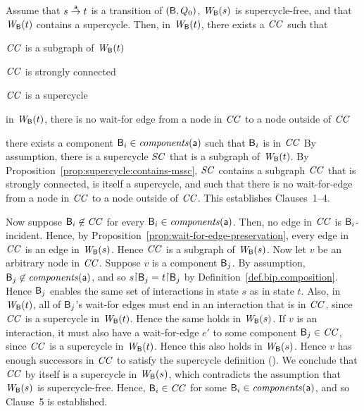  \label{prop:supercycle-formation}
Assume that $s \goesto[\act] t$ is a transition of $(\B, Q_0)$, $\wfg{\B}{s}$ is supercycle-free, and that $\wfg{\B}{t}$
contains a supercycle.  Then, in $\wfg{\B}{t}$, there exists a $\CC$ such that
\bn
\item $\CC$ is a subgraph of $\wfg{\B}{t}$
\item $\CC$ is strongly connected
\item $\CC$ is a supercycle
\item  in $\wfg{\B}{t}$, there is no wait-for edge from a node in $\CC$ to a node outside of $\CC$
\item there exists a component $\B_i \in \cmps{\act}$ such that $\B_i$ is in $\CC$
\en
\ep
%
\bpr
By assumption, there is a supercycle $\SC$ that is a subgraph of $\wfg{\B}{t}$.
By Proposition~\ref{prop:supercycle:contains-mssc}, $\SC$ contains a
subgraph $\CC$ that is strongly connected, is itself a supercycle, and
such that there is no wait-for-edge from a node in $\CC$ to a node outside of $\CC$.
This establishes Clauses~1--4.

Now suppose $\B_i \not\in \CC$ for every $\B_i \in \cmps{\act}$. Then, no edge in $\CC$ is
$\B_i$-incident.  Hence, by Proposition~\ref{prop:wait-for-edge-preservation}, every edge in $\CC$
is an edge in $\wfg{\B}{s}$. Hence $\CC$ is a subgraph of $\wfg{\B}{s}$.
%
Now let $v$ be an arbitrary node in $\CC$.
%
Suppose $v$ is a component $\B_j$.  By assumption, $\B_j \not\in \cmps{\act}$, and so
$s \pj \B_j = t \pj \B_j$ by Definition~\ref{def.bip.composition}. Hence $\B_j$ enables the same set
of interactions in state $s$ as in state $t$. Also, in $\wfg{\B}{t}$, all of $\B_j$'s wait-for edges
must end in an interaction that is in $\CC$, since $\CC$ is a supercycle in $\wfg{\B}{t}$. Hence the
same holds in $\wfg{\B}{s}$.
%
If $v$ is an interaction, it must also have a wait-for-edge $e'$ to some component $\B_j \in \CC$,
since $\CC$ is a supercycle in $\wfg{\B}{t}$. Hence this also holds in $\wfg{\B}{s}$.
%
Hence $v$ has enough successors in $\CC$ to satisfy the supercycle definition ().
%
We conclude that $\CC$ by itself is a supercycle in $\wfg{\B}{s}$, which contradicts the assumption
that $\wfg{\B}{s}$ is supercycle-free. Hence, $\B_i \in \CC$ for some $\B_i \in \cmps{\act}$, and so
Clause~5 is established.  
\epr




